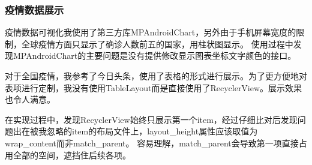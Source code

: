 \documentclass[UTF8]{article}
\begin{document}
\subsubsection{疫情数据展示}
疫情数据可视化我使用了第三方库MPAndroidChart，另外由于手机屏幕宽度的限制，全球疫情方面只显示了确诊人数前五的国家，用柱状图显示。
使用过程中发现MPAndroidChart的主要问题是没有提供修改显示图表坐标文字颜色的接口。

对于全国疫情，我参考了今日头条，使用了表格的形式进行展示。为了更方便地对表项进行定制，我没有使用TableLayout而是直接使用了RecyclerView。展示效果也令人满意。

在实现过程中，发现RecyclerView始终只展示第一个item，经过仔细比对后发现问题出在被我忽略的item的布局文件上，layout\_height属性应该取值为wrap\_content而非match\_parent。
容易理解，match\_parent会导致第一项直接占用全部的空间，遮挡住后续各项。
\end{document}
